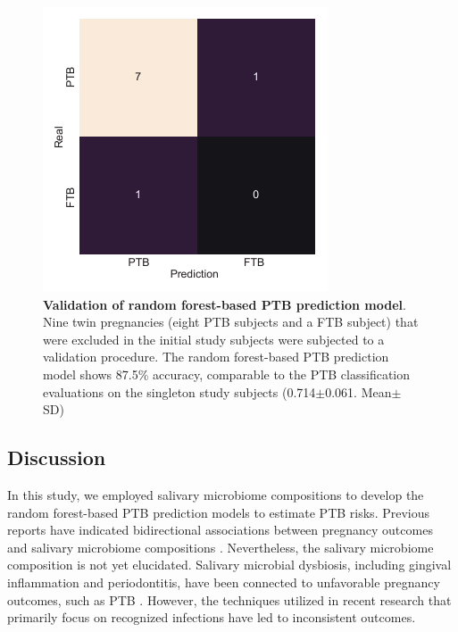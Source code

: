 \documentclass[11pt, a4paper, onecolumn, oneside]{report}
\begin{document}
            \begin{figure}[p]
                \centering
                \includegraphics[width=\linewidth]{Figures/PTB/FigS3-validation}
                \caption[Validation of random forest-based PTB prediction model]{\textbf{Validation of random forest-based PTB prediction model}. \\
                    Nine twin pregnancies (eight PTB subjects and a FTB subject) that were excluded in the initial study subjects were subjected to a validation procedure. The random forest-based PTB prediction model shows 87.5\% accuracy, comparable to the PTB classification evaluations on the singleton study subjects (0.714$\pm$0.061. Mean$\pm$SD)}
                \label{fig:PTB-validation}
            \end{figure}
            \clearpage
        \newpage

        \subsection{Discussion}
            In this study, we employed salivary microbiome compositions to develop the random forest-based PTB prediction models to estimate PTB risks. Previous reports have indicated bidirectional associations between pregnancy outcomes and salivary microbiome compositions \cite{PTB-mechanism-3}. Nevertheless, the salivary microbiome composition is not yet elucidated. Salivary microbial dysbiosis, including gingival inflammation and periodontitis, have been connected to unfavorable pregnancy outcomes, such as PTB \cite{PTB-mechanism-6}. However, the techniques utilized in recent research that primarily focus on recognized infections have led to inconsistent outcomes.
\end{document}
